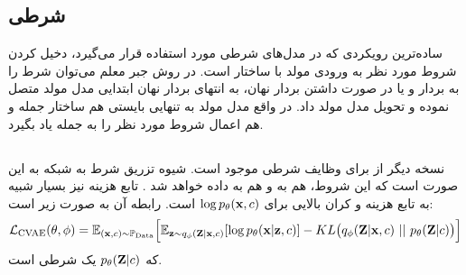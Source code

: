 \subsection{\rnn{}
     شرطی}
ساده‌ترین رویکردی که در مدل‌های شرطی مورد استفاده قرار می‌گیرد، دخیل کردن شروط مورد نظر به ورودی مولد با ساختار
است. در روش جبر معلم می‌توان شرط را به بردار
و  یا در صورت داشتن بردار نهان، به انتهای بردار نهان ابتدایی مدل مولد متصل نموده و تحویل مدل مولد داد. در واقع مدل مولد به تنهایی بایستی هم ساختار جمله و هم اعمال شروط مورد نظر را به جمله یاد بگیرد.
\subsection{\cvae{}}
نسخه دیگر از \vae{} برای وظایف شرطی موجود است. شیوه تزریق شرط به شبکه به این صورت است که این شروط، هم به \encoder{} و هم به \decoder{} داده خواهد شد \cite{cvae, cvae_semi}. تابع هزینه نیز بسیار شبیه به تابع هزینه \vae{} و کران بالایی برای $\log p_\theta({\bf x},c)$ است. رابطه آن به صورت زیر است:
\begin{align}
	{\mathcal{L}}_\text{CVAE}(\theta, \phi) = \mathbb E_{({\bf x},c) \sim \mathbb P_\text{Data}} \Big[
		\mathbb E_{{\bf z} \sim q_\phi({\bf Z}|{\bf x}, c)} [\log p_\theta({\bf x}|{\bf z}, c)]
		- KL\big(q_\phi({\bf Z}|{\bf x},c) ~ || ~ p_\theta({\bf Z}|c) \big)
		\Big]
\end{align}
که $p_\theta({\bf Z}|c)$  یک \priordist{} شرطی است.

